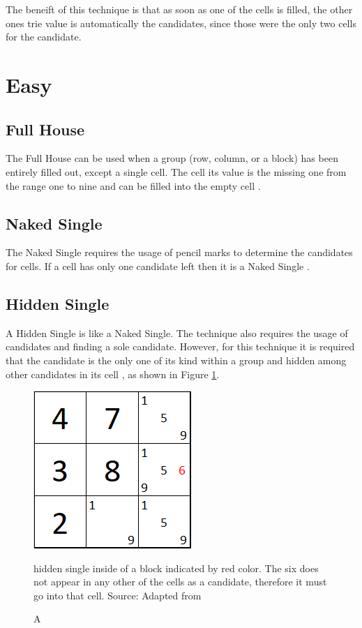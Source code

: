 \documentclass[twoside]{ausarbeitung}
\begin{document}
The beneift of this technique is that as soon as one of the cells is filled, the other ones trie value is automatically the candidates, since those were the only two cells for the candidate.


\section{Easy}

\subsection{Full House}
The Full House can be used when a group (row, column, or a block) has been entirely filled out, except a single cell. The cell its value is the missing one from the range one to nine and can be filled into the empty cell \cite{SolvingS57:online}.  


\subsection{Naked Single}
The Naked Single requires the usage of pencil marks to determine the candidates for cells. If a cell has only one candidate left then it is a Naked Single \cite{SudokuLo64:online}.

\subsection{Hidden Single}
A Hidden Single is like a Naked Single. The technique also requires the usage of candidates and finding a sole candidate. However, for this technique it is required that the candidate is the only one of its kind within a group and hidden among other candidates in its cell \cite{SolvingS57:online}, as shown in  Figure \ref{fig:hiddensingle}.

\begin{figure}[H]
  \centering
  \includegraphics[width=.25\linewidth]{images/hiddensingle}
  \caption[Hidden Single] A hidden single inside of a block indicated by red color. The six does not appear in any other of the cells as a candidate, therefore it must go into that cell. Source: Adapted from \cite{SolvingS57:online}
  \label{fig:hiddensingle}
\end{figure}%
\end{document}
